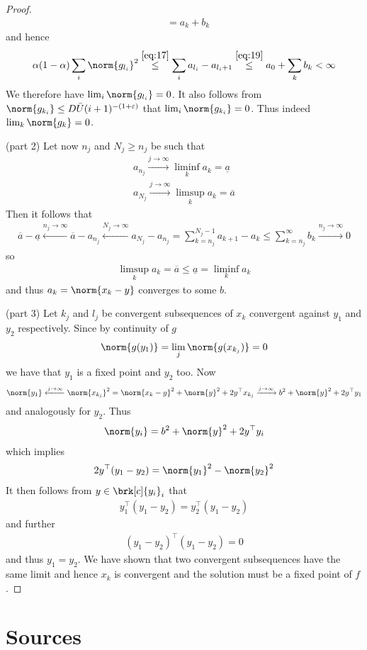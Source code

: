 \begin{proof}
\begin{equation}
\begin{aligned}
		&= a_k+b_k
	\end{aligned}
	\label{eq:19}
	\end{equation}
	and hence
	\begin{align*}
		\alpha(1-\alpha)\sum_i\norm{g_{l_i}}^2
		\stackrel{\eqref{eq:17}}{\leq} \sum_i a_{l_i}-a_{l_i+1}
		\stackrel{\eqref{eq:19}}{\leq}a_0+\sum_k b_k
		<\infty
	\end{align*}
	We therefore have $\lim_i\norm{g_{l_i}}=0$. It also follows from $\norm{g_{k_i}}\leq D\barU (i+1)^{-(1+\e)}$ that $\lim_i\norm{g_{k_i}}=0$. Thus indeed $\lim_k\norm{g_k}=0$.
	
	(part 2)
	Let now $n_j$ and  $N_j\geq n_j$ be such that
	\begin{align*}
		a_{n_j}\xrightarrow{j\to\infty}\liminf_ka_k=\underline{a} \\
		a_{N_j}\xrightarrow{j\to\infty}\limsup_ka_k=\overline{a}	
	\end{align*}
	Then it follows that
	\begin{align*}
		\overline{a}-\underline{a}
		\xleftarrow{n_j\to\infty}\overline{a}-a_{n_j}
		\xleftarrow{N_j\to\infty}a_{N_j}-a_{n_j}
		= \sum_{k=n_j}^{N_j-1}a_{k+1}-a_k
		\leq \sum_{k=n_j}^\infty b_k
		\xrightarrow{n_j\to\infty}0
	\end{align*}
	so
	\begin{align*}
		\limsup_ka_k=\overline{a}\leq \underline{a}=\liminf_ka_k
	\end{align*}
	and thus $a_k=\norm{x_k-y}$ converges to some $b$.
	
	(part 3)
	Let $k_j$ and $l_j$ be convergent subsequences of $x_k$ convergent against $y_1$ and $y_2$ respectively. Since by continuity of $g$
	\begin{align*}
		\norm{g(y_1)}=\lim_j\norm{g(x_{k_j})}=0
	\end{align*}
	we have that $y_1$ is a fixed point and $y_2$ too.
	Now
	\begin{align*}
		\norm{y_1} 
		\xleftarrow{j\to\infty} \norm{x_{k_j}}^2
		= \norm{x_k-y}^2+\norm{y}^2+2y^\top x_{k_j}
		\xrightarrow{j\to\infty} b^2+\norm{y}^2+2y^\top y_1
	\end{align*}
	and analogously for $y_2$. Thus
	\begin{align*}
		\norm{y_i}=b^2+\norm{y}^2+2y^\top y_i
	\end{align*}
	which implies
	\begin{align*}
		2y^\top(y_1-y_2) = \norm{y_1}^2-\norm{y_2}^2
	\end{align*}
	It then follows from $y\in\brk[c]{y_i}_i$ that
	\begin{align*}
		y_1^\top(y_1-y_2) = y_2^\top(y_1-y_2)
	\end{align*}
	and further
	\begin{align*}
		(y_1-y_2)^\top(y_1-y_2) = 0
	\end{align*}
	and thus $y_1=y_2$. We have shown that two convergent subsequences have the same limit and hence $x_k$ is convergent and the solution must be a fixed point of $f$.
\end{proof}


\newpage
\section*{Sources}
\nocite{*}
%	
%	
\printbibliography

